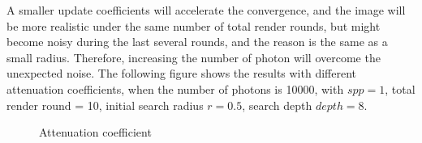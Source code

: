 \documentclass[acmtog]{acmart}
\begin{document}
	A smaller update coefficients will accelerate the convergence, and the image will be more realistic under the same number of total render rounds, 
	but might become noisy during the last several rounds, and the reason is the same as a small radius. 
	Therefore, increasing the number of photon will overcome the unexpected noise. The following figure shows the results with different attenuation coefficients, 
	when the number of photons is 10000, with $spp = 1$, total render round = 10, initial search radius $r = 0.5$, search depth $depth = 8$.
	\begin{figure}[H]
	\centering
		\caption{Attenuation coefficient}
	\end{figure} 
	
\end{document}
